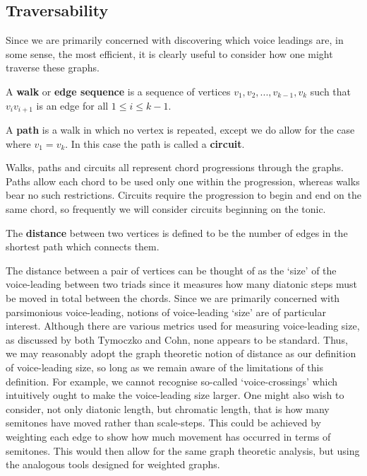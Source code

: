 \documentclass[]{tMAM2e}
\begin{document}

\subsection{Traversability}

Since we are primarily concerned with discovering which voice leadings are, in some sense, the most efficient, it is clearly useful to consider how one might traverse these graphs.

\begin{definition} A \textbf{walk} or \textbf{edge sequence} is a sequence of vertices $v_1,v_2,...,v_{k-1},v_k$ such that $v_iv_{i+1}$ is an edge for all $1 \leq i \leq k-1$.
\end{definition}

\begin{definition} A \textbf{path} is a walk in which no vertex is repeated, except we do allow for the case where $v_1=v_k$. In this case the path is called a \textbf{circuit}.
\end{definition}


Walks, paths and circuits all represent chord progressions through the graphs. Paths allow each chord to be used only one within the progression, whereas walks bear no such restrictions. Circuits require the progression to begin and end on the same chord, so frequently we will consider circuits beginning on the tonic.

\begin{definition}The \textbf{distance} between two vertices is defined to be the number of edges in the shortest path which connects them. 
\end{definition}

The distance between a pair of vertices can be thought of as the `size' of the voice-leading between two triads since it measures how many diatonic steps must be moved in total between the chords. Since we are primarily concerned with parsimonious voice-leading, notions of voice-leading `size' are of particular interest. Although there are various metrics used for measuring voice-leading size, as discussed by both Tymoczko\cite{tymoczko2011geometry} and Cohn\cite{cohn2012audacious}, none appears to be standard. Thus, we may reasonably adopt the graph theoretic notion of distance as our definition of voice-leading size, so long as we remain aware of the limitations of this definition. For example, we cannot recognise so-called `voice-crossings' which intuitively ought to make the voice-leading size larger. One might also wish to consider, not only diatonic length, but chromatic length, that is how many semitones have moved rather than scale-steps. This could be achieved by weighting each edge to show how much movement has occurred in terms of semitones. This would then allow for the same graph theoretic analysis, but using the analogous tools designed for weighted graphs.
\end{document}
